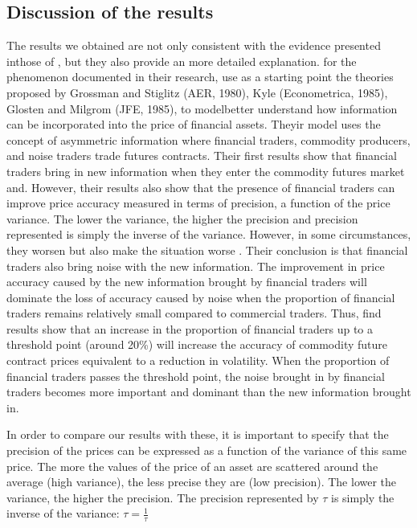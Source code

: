 \documentclass[12pt]{article}
\begin{document}
\subsection{Discussion of the results}
The results we obtained are not only consistent with the evidence presented inthose of \citet{goldstein2019commodity}, but they also provide an more detailed explanation. for the phenomenon documented in their research, \citet{goldstein2019commodity} use as a starting point the theories proposed by Grossman and Stiglitz (AER, 1980), Kyle (Econometrica, 1985), Glosten and Milgrom (JFE, 1985), to modelbetter understand how information can be incorporated into the price of financial assets. Theyir model uses the concept of asymmetric information where financial traders, commodity producers, and noise traders trade futures contracts. Their first results show that financial traders bring in new information when they enter the commodity futures market and. However, their results also show that the presence of financial traders can improve price accuracy measured in terms of precision, a function of the price variance. The lower the variance, the higher the precision and precision represented is simply the inverse of the variance. However, in some circumstances, they worsen  but also make the situation worse . Their conclusion is that financial traders also bring noise with the new information. The improvement in price accuracy caused by the new information brought by financial traders will dominate the loss of accuracy caused by noise when the proportion of financial traders remains relatively small compared to commercial traders. Thus, \citet{goldstein2019commodity} find results show that an increase in the proportion of financial traders up to a threshold point (around 20\%) will increase the accuracy of commodity future contract prices equivalent to a reduction in volatility. When the proportion of financial traders passes the threshold point, the noise brought in by financial traders becomes more important and dominant than the new information brought in.


In order to compare our results with these, it is important to specify that the precision of the prices can be expressed as a function of the variance of this same price. The more the values of the price of an asset are scattered around the average (high variance), the less precise they are (low precision).  The lower the variance, the higher the precision. The precision represented by $\tau$ is simply the inverse of the variance: $\tau=\frac{1}{\tau}$ 
\end{document}
